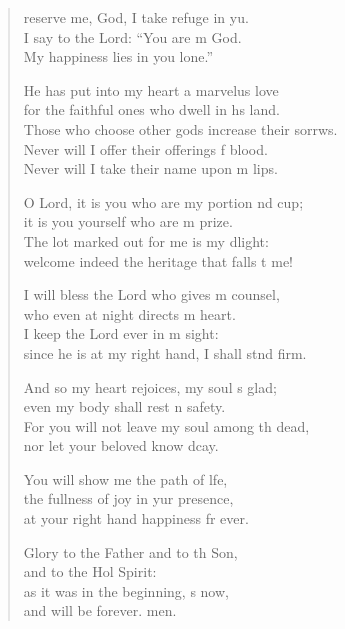 \begin{verse}
  \begin{patverse}
reserve me, God, I take refuge in yu.\Flex\\
I say to the Lord: “You are m God.\Med\\
My happiness lies in you lone.”

He has put into my heart a marvelus love\Med\\
for the faithful ones who dwell in h\pointup{\i}s land.\\
Those who choose other gods increase their sorrws.\Flex\\
Never will I offer their offerings f blood.\Med\\
Never will I take their name upon m lips.

O Lord, it is you who are my portion nd cup;\Med\\
it is you yourself who are m prize.\\
The lot marked out for me is my dlight:\Med\\
welcome indeed the heritage that falls t me!

I will bless the Lord who gives m counsel,\Med\\
who even at night directs m heart.\\
I keep the Lord ever in m sight:\Med\\
since he is at my right hand, I shall stnd firm.

And so my heart rejoices, my soul \pointup{\i}s glad;\Med\\
even my body shall rest \pointup{\i}n safety.\\
For you will not leave my soul among th dead,\Med\\
nor let your beloved know dcay.

You will show me the path of l\pointup{\i}fe,\Flex\\
the fullness of joy in yur presence,\Med\\
at your right hand happiness fr ever.

Glory to the Father and to th Son,\Med\\
and to the Hol Spirit:\\
as it was in the beginning, \pointup{\i}s now,\Med\\
and will be forever. men. 
  \end{patverse}
\end{verse}
